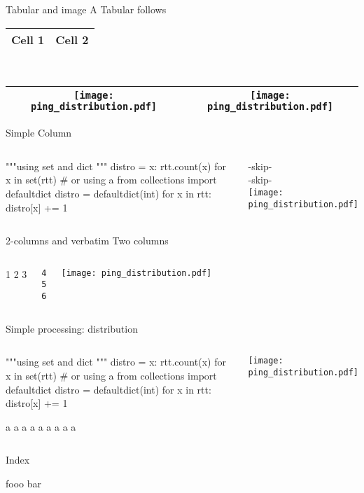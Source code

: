 \begin{frame}[fragile]{Tabular and image}
A Tabular follows \\
\begin{tabular}{|c|c|}\hline
Cell 1 & Cell 2 \\
\hline 
\end{tabular}
\\
\begin{table}
\begin{tabular}{|c|c|}\hline
\texttt{[image: ping\_distribution.pdf]}   & \texttt{[image: ping\_distribution.pdf]}  \\
\hline 
\end{tabular}
\end{table}
\end{frame}

\begin{frame}[fragile]{Simple Column}
\begin{columns}
\column[t]{5cm}
\begin{pythoncode}
"""using set and dict
"""
distro = {x: rtt.count(x) 
  for x in set(rtt)}
# or using a
from collections import defaultdict
distro = defaultdict(int)
for x in rtt:
    distro[x] += 1
    

\end{pythoncode}
\column[t]{5cm}
-skip-\\
-skip-\\
\texttt{[image: ping\_distribution.pdf]}  
\end{columns}
\end{frame}


\begin{frame}[fragile]{2-columns and verbatim}
Two columns
\begin{columns}

\column[t]{5cm}
1
2
3
\begin{verbatim}
4
5
6
\end{verbatim}

\column[t]{5cm}
\texttt{[image: ping\_distribution.pdf]}  
\end{columns}

\end{frame}



\begin{frame}[fragile]{Simple processing: distribution}
\begin{columns}
\column[t]{5cm}
\begin{pythoncode}
"""using set and dict
"""
distro = {x: rtt.count(x) 
  for x in set(rtt)}
# or using a
from collections import defaultdict
distro = defaultdict(int)
for x in rtt:
    distro[x] += 1
    
a
a
a
a
a
a
a
a
a

    
    
    
    
\end{pythoncode}
\column[t]{5cm}
\texttt{[image: ping\_distribution.pdf]}  
\end{columns}
\end{frame}

\begin{frame}{Index}
\printindex

fooo bar

\end{frame}
